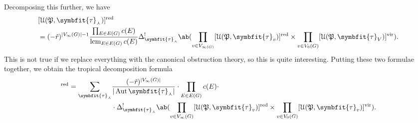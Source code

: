 \documentclass[10pt,oldfontcommands,oneside]{memoir}
\theoremstyle{definition}
\theoremstyle{remark}
\theoremstyle{plain}
\theoremstyle{definition}
\theoremstyle{remark}
\newcommand{\mc}[1]{\mathcal{#1}}
\newcommand{\mf}[1]{\mathfrak{#1}}
\newcommand{\btau}{\symbfit{\tau}}
\newcommand{\mr}[1]{\mathrm{#1}}
\newcommand{\on}[1]{\operatorname{#1}}
\newcommand{\1}{\mathbf{1}}
\newcommand{\2}{\mathbf{2}}
\newcommand{\3}{\mathbf{3}}
\newcommand{\vir}{\mr{vir}}
\newcommand{\red}{\mr{red}}
\DeclareMathOperator{\Aut}{Aut}
\begin{document}
Decomposing this further, we have
\begin{align*}
    &[\mc{U}(\mf{P}, \btau_{\curlywedge})]^{\on{red}} \\ 
    &= (-\tilde{r})^{|V_{\infty}(G)|-1} \frac{\prod_{E \in E(G)} c(E)}{\on{lcm}_{E \in E(G)} c(E)} \Delta^!_{\btau_{\curlywedge}} \ab(\prod_{v \in V_{\infty(G)}} [\mc{U}(\mf{P}, \btau_v)]^{\on{red}} \times \prod_{v \in V_0(G)} [\mc{U}(\mf{P}, \btau_V)]^{\vir}). 
\end{align*}
This is not true if we replace everything with the canonical obstruction theory, so this is quite interesting. Putting these two formulae together, we obtain the tropical decomposition formula
\begin{align*}
    [\mc{U}_{g, \vec{c}}(\mf{P}, \beta)]^{\on{red}} = \sum_{\btau_{\curlywedge}} & \frac{(-\tilde{r})^{|V_{\infty}(G)|}}{|\Aut \btau_{\curlywedge}|} \cdot \prod_{E \in E(G)} c(E) \cdot \\
    & \cdot \Delta_{\btau_{\curlywedge}}^! \ab( \prod_{v \in V_{\infty}(G)}[\mc{U}(\mf{P},\btau_{v})]^{\red} \times \prod_{v \in V_0(G)} [\mc{U}(\mf{P},\btau_v)]^{\vir}).
\end{align*}
\end{document}
